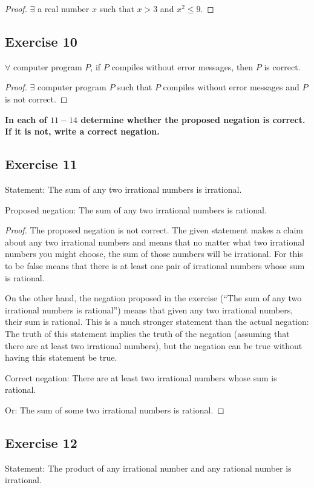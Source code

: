 \documentclass[14pt]{extarticle}
\newcommand{\fa}{\forall}
\newcommand{\te}{\exists}
\begin{document}
\begin{proof}
$\te$ a real number $x$ such that $x > 3$ and $x^2 \leq 9$.
\end{proof}

\subsection{Exercise 10}
$\fa$ computer program $P$, if $P$ compiles without error messages, then $P$ is correct.

\begin{proof}
$\te$ computer program $P$ such that $P$ compiles without error messages and $P$ is not correct.
\end{proof}

{\bf \color{cyan} In each of $11-14$ determine whether the proposed negation is correct. If it is not, write a correct negation.}

\subsection{Exercise 11}
Statement: The sum of any two irrational numbers is irrational.

Proposed negation: The sum of any two irrational numbers is rational.

\begin{proof}
The proposed negation is not correct. The given statement makes a claim about any two irrational numbers and means that no matter what two irrational numbers you might choose, the sum of those numbers will be irrational. For this to be false means that there is at least one pair of irrational numbers whose sum is rational. 

On the other hand, the negation proposed in the exercise (“The sum of any two irrational numbers is rational”) means that given any two irrational numbers, their sum is rational. This is a much stronger statement than the actual negation: The truth of this statement implies the truth of the negation (assuming that there are at least two irrational numbers), but the negation can be true without having this statement be true.

Correct negation: There are at least two irrational numbers whose sum is rational.

Or: The sum of some two irrational numbers is rational.
\end{proof}

\subsection{Exercise 12}
Statement: The product of any irrational number and any rational number is irrational.
\end{document}
